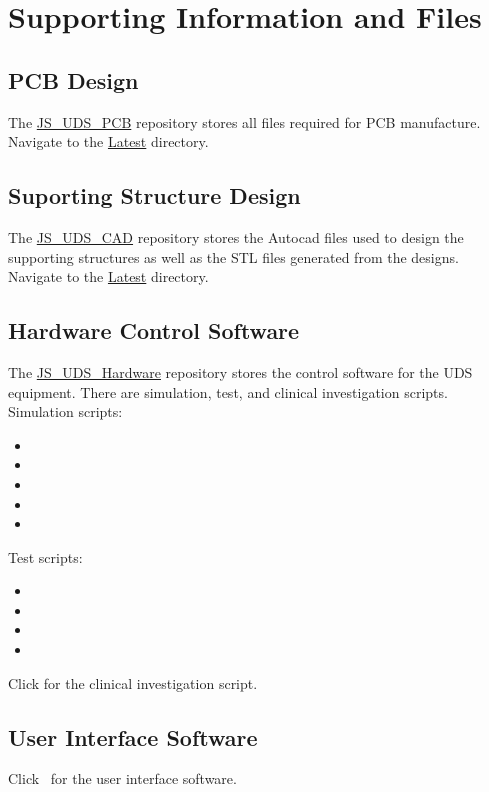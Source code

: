 \section{Supporting Information and Files}

\subsection{PCB Design}

The \href{https://github.com/M-JEFFRYES/JS_UDS_PCB}{JS\_UDS\_PCB} repository stores all files required for PCB manufacture. Navigate to the \href{https://github.com/M-JEFFRYES/JS_UDS_PCB/tree/main/Latest}{Latest} directory. 

\subsection{Suporting Structure Design}

The \href{https://github.com/M-JEFFRYES/JS_UDS_CAD}{JS\_UDS\_CAD} repository stores the Autocad files used to design the supporting structures as well as the STL files generated from the designs. Navigate to the \href{https://github.com/M-JEFFRYES/JS_UDS_CAD/tree/main/Latest}{Latest} directory.

\subsection{Hardware Control Software}

The \href{https://github.com/M-JEFFRYES/JS_UDS_Hardware}{JS\_UDS\_Hardware} repository stores the control software for the UDS equipment. There are simulation, test, and clinical investigation scripts. \\

Simulation scripts:
\begin{itemize}
    \item \pressuresimrepo
    \item \pumpsimrepo
    \item \visimrepo
    \item \vvsimrepo
    \item \investigationsimrepo
\end{itemize}


Test scripts:
\begin{itemize}
    \item \pressuretestrepo
    \item \pumptestrepo
    \item \vitestrepo
    \item \vvtestrepo
\end{itemize}

Click \fullclinicalrepo for the clinical investigation script.

\subsection{User Interface Software}
Click \uiswrepo \ for the user interface software.

\clearpage